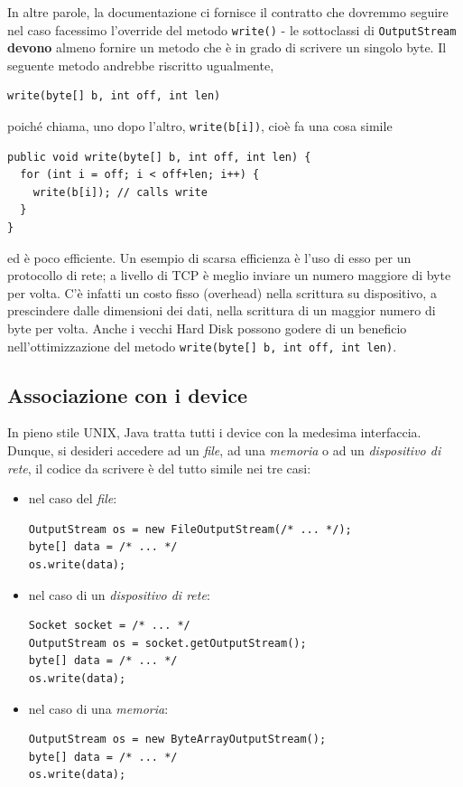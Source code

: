\documentclass[\fontsizeclass,twocolumn]{\classname}
\theoremstyle{definition}
\theoremstyle{definition}
\begin{document}
In altre parole, la documentazione ci fornisce il contratto che dovremmo
seguire nel caso facessimo l'override del metodo \texttt{write()} \-- le
sottoclassi di \texttt{Output\-Stream} \textbf{devono} almeno fornire un metodo
che è in grado di scrivere un singolo byte. Il seguente metodo andrebbe riscritto ugualmente,

\begin{lstlisting}
write(byte[] b, int off, int len)
\end{lstlisting}

poiché chiama, uno dopo l'altro, \texttt{write(b[i])}, cioè fa una cosa simile

\begin{lstlisting}
public void write(byte[] b, int off, int len) {
  for (int i = off; i < off+len; i++) {
    write(b[i]); // calls write
  }
}
\end{lstlisting}

ed è poco efficiente. Un esempio di scarsa efficienza è l'uso di esso per un protocollo di rete;
a livello di TCP è meglio inviare un numero maggiore di byte per volta. C'è
infatti un costo fisso (overhead) nella scrittura su dispositivo, a prescindere
dalle dimensioni dei dati, nella scrittura di un maggior numero di byte per
volta. Anche i vecchi Hard Disk possono godere di un beneficio
nell'ottimizzazione del metodo \texttt{write(byte[] b, int off, int len)}.

\subsection{Associazione con i device}

In pieno stile UNIX, Java tratta tutti i device con la medesima interfaccia.
Dunque, si desideri accedere ad un \emph{file}, ad una \emph{memoria} o ad un
\emph{dispositivo di rete}, il codice da scrivere è del tutto simile nei tre
casi:

\begin{itemize}
    \item nel caso del \emph{file}:
\begin{lstlisting}
OutputStream os = new FileOutputStream(/* ... */);
byte[] data = /* ... */
os.write(data);
\end{lstlisting}
    \item nel caso di un \emph{dispositivo di rete}:
\begin{lstlisting}
Socket socket = /* ... */
OutputStream os = socket.getOutputStream();
byte[] data = /* ... */
os.write(data);
\end{lstlisting}
    \item nel caso di una \emph{memoria}:
\begin{lstlisting}
OutputStream os = new ByteArrayOutputStream();
byte[] data = /* ... */
os.write(data);
\end{lstlisting}
\end{itemize}
\end{document}
